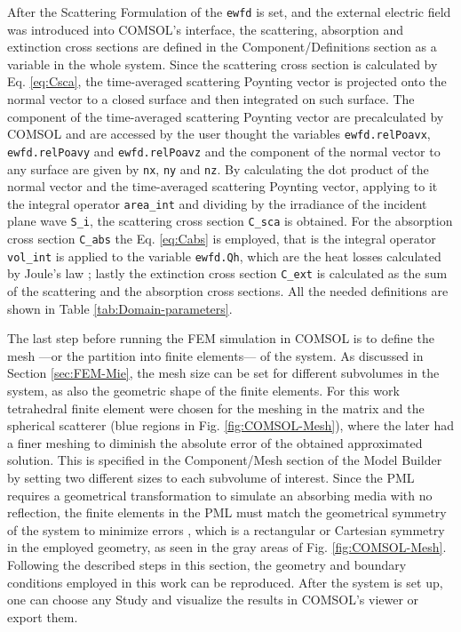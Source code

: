 After the Scattering Formulation of the \lstinline!ewfd! is set, and the external electric field was introduced into COMSOL's interface, the scattering, absorption and extinction cross sections are defined in the Component/Definitions section as a variable in the whole system. Since the scattering cross section is calculated by Eq. \eqref{eq:Csca}, the time-averaged scattering Poynting vector is projected onto the normal vector to a closed surface and then integrated on such surface. The component of the time-averaged scattering Poynting vector are precalculated by COMSOL and are accessed by the user thought the variables  \lstinline!ewfd.relPoavx!, \lstinline!ewfd.relPoavy! and \lstinline!ewfd.relPoavz! \cite{comsol_wave} and the component of the normal vector to any surface are given by \lstinline!nx!, \lstinline!ny! and \lstinline!nz!. By calculating the dot product of the normal vector and the time-averaged scattering Poynting vector, applying to it the integral operator \lstinline!area_int! and dividing by the irradiance of the incident plane wave \lstinline!S_i!, the scattering cross section  \lstinline!C_sca! is obtained. For the absorption cross section \lstinline!C_abs! the Eq. \eqref{eq:Cabs} is employed, that is the integral operator \lstinline!vol_int! is applied to the variable \lstinline!ewfd.Qh!, which are the heat losses calculated by Joule's law \cite{comsol_wave}; lastly the extinction cross section \lstinline!C_ext! is calculated as the sum of the scattering and the absorption cross sections. All the needed definitions are shown in Table \ref{tab:Domain-parameters}.

The last step before running the FEM simulation in COMSOL is to define the mesh ---or the partition into finite elements--- of the system.  As discussed in Section \ref{sec:FEM-Mie}, the mesh size can be set for different subvolumes in the system, as also the geometric shape of the finite elements. For this work tetrahedral finite element were chosen for the meshing in the matrix and the spherical scatterer (blue regions in Fig. \ref{fig:COMSOL-Mesh}), where the later had a finer meshing to diminish the absolute error of the obtained approximated solution. This is specified in the Component/Mesh section of the Model Builder by setting two different sizes to each subvolume of interest. Since the PML requires a geometrical transformation to simulate an absorbing media with no reflection, the finite elements in the PML must match the  geometrical symmetry of the system to minimize errors \cite{comsol_doc}, which is a rectangular or Cartesian symmetry in the employed geometry, as seen in the gray areas of  Fig. \ref{fig:COMSOL-Mesh}. Following the described steps in this section, the  geometry and boundary conditions employed in this work can be reproduced. After the system is set up, one can choose any Study and visualize the results in COMSOL's viewer or export them.

